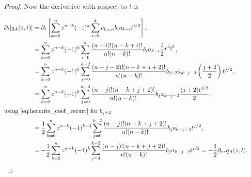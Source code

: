 \begin{proof}
        Now the derivative with respect to $t$ is


        \begin{align*}
            \partial_t [q_A(z,t)] &= \partial_t \left[ \sum_{k=0}^n z^{n-k}(-1)^k \sum_{i=0}^k c_{k,i,n} b_i a_{k-i} t^{i/2} \right],\\ 
            &= \sum_{k=0}^n z^{n-k}(-1)^k \sum_{i=0}^k \frac{(n-i)!(n-k+i)!}{n!(n-k)!} b_i a_{k-i} \frac{i}{2}t^{\frac{i-2}{2}},\\ 
            &= \sum_{k=0}^n z^{n-k}(-1)^k \sum_{j=0}^{k-2} \frac{(n-j-2)!(n-k+j+2)!}{n!(n-k)!} b_{j+2}a_{k-j-2}\left( \frac{j+2}{2} \right)t^{j/2},\\ 
            &= \sum_{k=0}^n z^{n-k}(-1)^k \sum_{j=0}^{k-2} \frac{(n-j)!(n-k+j+2)!}{n!(n-k)!} b_ja_{k-j-2}\frac{(j+2)t^{j/2}}2,\\
            \intertext{using \eqref{eq:hermite_coef_recurr} for $b_{j+2}$} 
            &= \frac12 \sum_{k=0}^n z^{n-k}(-1)^{k+1} \sum_{j=0}^{k-2} \frac{(n-j)!(n-k+j+2)!}{n!(n-k)!} b_ja_{k-j-2}t^{j/2}, \\ 
            &= -\frac12 \sum_{k=2}^n z^{n-k}(-1)^{k} \sum_{j=0}^{k-2} \frac{(n-j)!(n-k+j+2)!}{n!(n-k)!} b_ja_{k-j-2}t^{j/2} = -\frac12 \partial_{zz} q_A(z,t).
        \end{align*}
    \end{proof}
    
